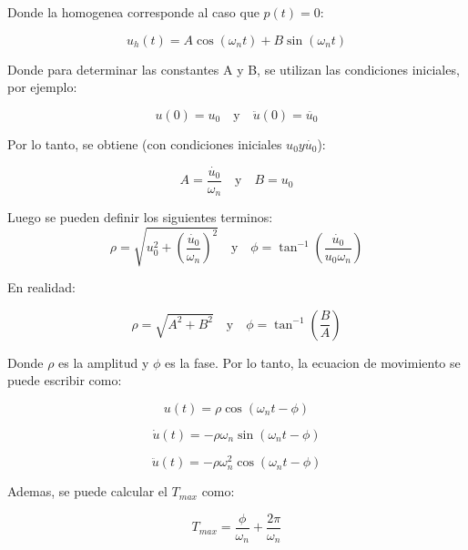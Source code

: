 \documentclass{article}  %
\begin{document}
Donde la homogenea corresponde al caso que $p(t) = 0$:

\begin{equation}
    u_h(t) = A \cos(\omega_n t) + B \sin(\omega_n t)
\end{equation}

Donde para determinar las constantes A y B, se utilizan las condiciones iniciales, por ejemplo:

\begin{equation}
    u(0) = u_0 \quad \text{y} \quad \ddot{u}(0) = \ddot{u_0}
\end{equation}

Por lo tanto, se obtiene (con condiciones iniciales $u_0 y \dot{u_0}$):

\begin{equation}
    A = \frac{\dot{u_0}}{\omega_n} \quad \text{y} \quad B = u_0
\end{equation}

Luego se pueden definir los siguientes terminos:
\begin{equation}
    \rho = \sqrt{u_0^2 + (\frac{\dot{u_0}}{\omega_n})^2} \quad \text{y} \quad \phi = \tan^{-1}(\frac{\dot{u_0}}{u_0 \omega_n})
\end{equation}

En realidad:

\begin{equation}
    \rho = \sqrt{A^2 + B^2} \quad \text{y} \quad \phi = \tan^{-1}(\frac{B}{A})
\end{equation}

Donde $\rho$ es la amplitud y $\phi$ es la fase. Por lo tanto, la ecuacion de movimiento se puede escribir como:

\begin{equation}
    u(t) = \rho \cos(\omega_n t - \phi)
\end{equation}

\begin{equation}
    \dot{u}(t) = -\rho \omega_n \sin(\omega_n t - \phi)
\end{equation}

\begin{equation}
    \ddot{u}(t) = -\rho \omega_n^2 \cos(\omega_n t - \phi)
\end{equation}

Ademas, se puede calcular el $T_{max}$ como:

\begin{equation}
    T_{max} = \frac{\phi}{\omega_n} + \frac{2\pi}{\omega_n} 
\end{equation}
\end{document}
